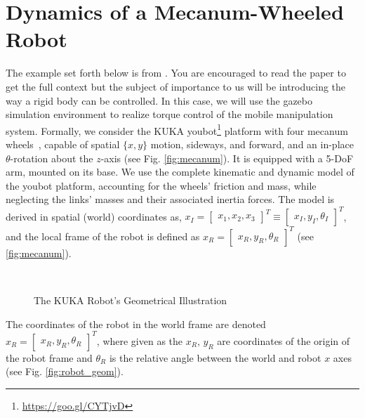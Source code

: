 \section{Dynamics of a Mecanum-Wheeled Robot}
%
The example set forth below is from \cite{Ogunmolu18IROS}. You are encouraged to read the paper to get the full context but the subject of importance to us will be introducing the way a rigid body can be controlled. In this case, we will use the gazebo simulation environment to realize torque control of the mobile manipulation system.  Formally,  we consider the KUKA youbot\footnote{\href{https://goo.gl/CYTjvD}{https://goo.gl/CYTjvD}} platform with four mecanum wheels~\cite{mecanum}, capable of spatial $\{x,y\}$ motion, \ie sideways, and forward, and an in-place $\theta$-rotation about the $z$-axis (see Fig. \autoref{fig:mecanum}). It is equipped with a 5-DoF arm, mounted on its base. We use the complete kinematic and dynamic model of the youbot platform, accounting for the wheels' friction and mass, while neglecting the links' masses and their associated inertia forces. %
The model is derived in spatial (world) coordinates as, $\textit{x}_I = \begin{bmatrix}\textit{x}_1, \textit{x}_2, \textit{x}_3\end{bmatrix}^T \equiv \begin{bmatrix}x_I, y_I, \theta_I\end{bmatrix}^T$, and the local frame of the robot is defined as $\textit{x}_R = \begin{bmatrix}x_R, y_R, \theta_R\end{bmatrix}^T$ (see \autoref{fig:mecanum}).
%
\begin{figure}[tb]
	\centering
	~ %
	\caption{The KUKA Robot's Geometrical Illustration}
\end{figure}
%
The coordinates of the robot in the world frame are  denoted $\textit{x}_R = \begin{bmatrix}x_R, y_R, \theta_R\end{bmatrix}^T$, where given as the $x_R,\,y_R$ are coordinates of the origin of the robot frame and $\theta_R$ is the relative angle between the  world and robot $x$ axes (see Fig. \autoref{fig:robot_geom}).
